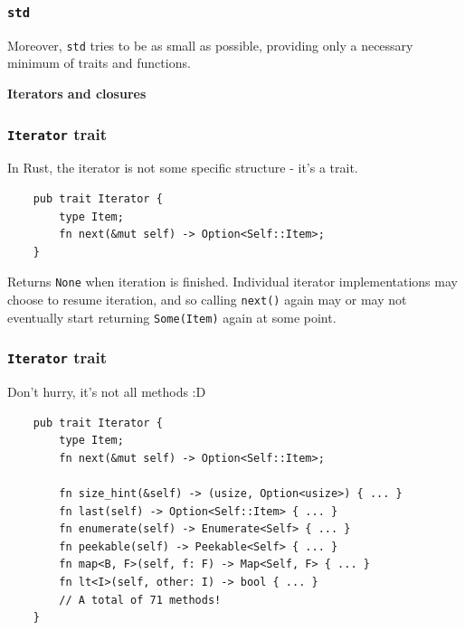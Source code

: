 \documentclass[aspectratio=1610,t]{beamer}
\begin{document}

\begin{frame}[fragile]
\frametitle{\texttt{std}}
Moreover, \texttt{std} tries to be as small as possible, providing only a necessary minimum of traits and functions.


\end{frame}


\begin{frame}[c]
\centering\Huge\textbf{Iterators and closures}
\end{frame}


\begin{frame}[fragile]
\frametitle{\texttt{Iterator} trait}
In Rust, the iterator is not some specific structure - it's a trait.

\begin{verbatim}
    pub trait Iterator {
        type Item;
        fn next(&mut self) -> Option<Self::Item>;
    }
\end{verbatim}

Returns \texttt{None} when iteration is finished. Individual iterator implementations may choose to resume iteration, and so calling \texttt{next()} again may or may not eventually start returning \texttt{Some(Item)} again at some point.
\end{frame}


\begin{frame}[fragile,c]
\frametitle{\texttt{Iterator} trait}
Don't hurry, it's not all methods :D

\begin{verbatim}
    pub trait Iterator {
        type Item;
        fn next(&mut self) -> Option<Self::Item>;

        fn size_hint(&self) -> (usize, Option<usize>) { ... }
        fn last(self) -> Option<Self::Item> { ... }
        fn enumerate(self) -> Enumerate<Self> { ... }
        fn peekable(self) -> Peekable<Self> { ... }
        fn map<B, F>(self, f: F) -> Map<Self, F> { ... }
        fn lt<I>(self, other: I) -> bool { ... }
        // A total of 71 methods!
    }
\end{verbatim}

\end{frame}
\end{document}
